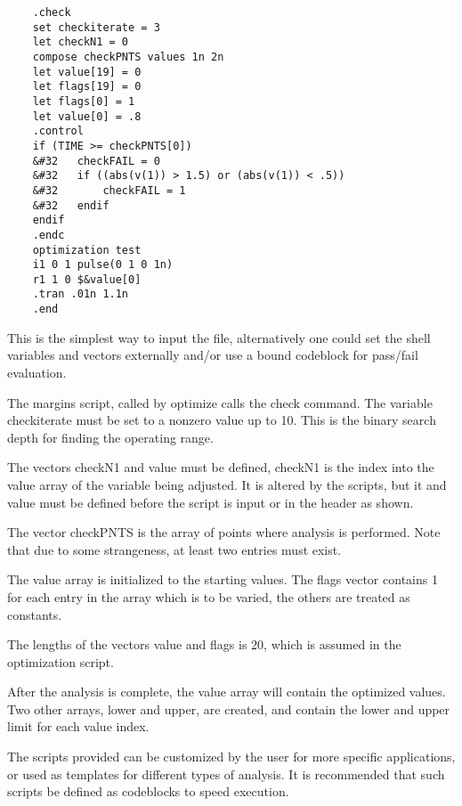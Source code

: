 \begin{verbatim}
    .check
    set checkiterate = 3
    let checkN1 = 0
    compose checkPNTS values 1n 2n
    let value[19] = 0
    let flags[19] = 0
    let flags[0] = 1
    let value[0] = .8
    .control
    if (TIME >= checkPNTS[0])
    &#32   checkFAIL = 0
    &#32   if ((abs(v(1)) > 1.5) or (abs(v(1)) < .5))
    &#32       checkFAIL = 1
    &#32   endif
    endif
    .endc
    optimization test
    i1 0 1 pulse(0 1 0 1n)
    r1 1 0 $&value[0]
    .tran .01n 1.1n
    .end
\end{verbatim}

This is the simplest way to input the file, alternatively one could
set the shell variables and vectors externally and/or use a bound
codeblock for pass/fail evaluation.

The {\vt margins} script, called by {\vt optimize} calls the {\et
check} command.  The variable {\vt checkiterate} must be set to a
nonzero value up to 10.  This is the binary search depth for finding
the operating range.

The vectors {\et checkN1} and {\et value} must be defined, {\et
checkN1} is the index into the value array of the variable being
adjusted.  It is altered by the scripts, but it and {\et value} must
be defined before the script is input or in the header as shown.

The vector {\et checkPNTS} is the array of points where analysis is
performed.  Note that due to some strangeness, at least two entries
must exist.

The {\et value} array is initialized to the starting values.  The {\et
flags} vector contains 1 for each entry in the array which is to be
varied, the others are treated as constants.

The lengths of the vectors {\et value} and {\et flags} is 20, which is
assumed in the optimization script.

After the analysis is complete, the {\et value} array will contain the
optimized values.  Two other arrays, {\et lower} and {\et upper}, are
created, and contain the lower and upper limit for each value index.

The scripts provided can be customized by the user for more specific
applications, or used as templates for different types of analysis. 
It is recommended that such scripts be defined as codeblocks to speed
execution.

